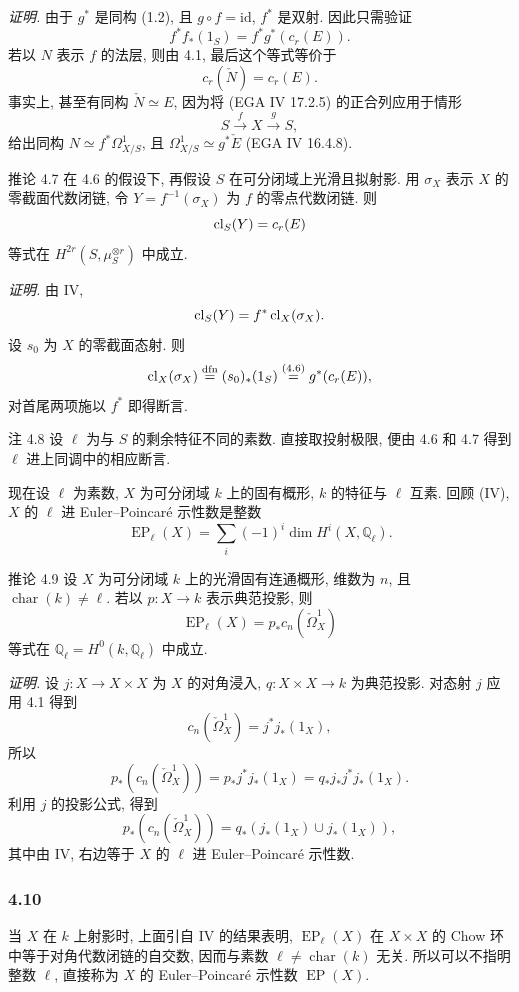 \emph{证明.} 由于 $g^*$ 是同构 (1.2), 且 $g\circ f=\mathrm{id}$, $f^*$ 是双射. 因此只需验证
\[
f^*f_*(1_S)=f^*g^*(c_r(E)).
\]
若以 $N$ 表示 $f$ 的法层, 则由 4.1, 最后这个等式等价于
\[
c_r(\check N)=c_r(E).
\]
事实上, 甚至有同构 $\check N\simeq E$, 因为将 (EGA IV 17.2.5) 的正合列应用于情形
\[
S\xrightarrow{f} X\xrightarrow{g} S,
\]
给出同构 $N\simeq f^*\Omega^1_{X/S}$, 且 $\Omega^1_{X/S}\simeq g^*\check E$ (EGA IV 16.4.8).

\begin{statement}{推论 4.7}
在 4.6 的假设下, 再假设 $S$ 在可分闭域上光滑且拟射影. 用 $\sigma_X$ 表示 $X$ 的零截面代数闭链, 令 $Y=f^{-1}(\sigma_X)$ 为 $f$ 的零点代数闭链. 则
\[
\operatorname{cl}_S(Y)=c_r(E)
\]
等式在 $H^{2r}(S,\mu_S^{\otimes r})$ 中成立.
\end{statement}

\emph{证明.} 由 IV,
\[
\operatorname{cl}_S(Y)=f^*\operatorname{cl}_X(\sigma_X).
\]
设 $s_0$ 为 $X$ 的零截面态射. 则
\[
\operatorname{cl}_X(\sigma_X)\stackrel{\mathrm{dfn}}{=}(s_0)_*(1_S)\stackrel{(4.6)}{=}g^*(c_r(E)),
\]
对首尾两项施以 $f^*$ 即得断言.

\begin{statement}{注 4.8}
设 $\ell$ 为与 $S$ 的剩余特征不同的素数. 直接取投射极限, 便由 4.6 和 4.7 得到 $\ell$ 进上同调中的相应断言.
\end{statement}

现在设 $\ell$ 为素数, $X$ 为可分闭域 $k$ 上的固有概形, $k$ 的特征与 $\ell$ 互素. 回顾 (IV), $X$ 的 $\ell$ 进 Euler--Poincaré 示性数是整数
\[
\operatorname{EP}_\ell(X)=\sum_i(-1)^i\dim H^i(X,\mathbb Q_\ell).
\]

\begin{statement}{推论 4.9}
设 $X$ 为可分闭域 $k$ 上的光滑固有连通概形, 维数为 $n$, 且 $\operatorname{char}(k)\ne\ell$. 若以 $p:X\to k$ 表示典范投影, 则
\[
\operatorname{EP}_\ell(X)=p_*c_n(\check\Omega^1_X)
\]
等式在 $\mathbb Q_\ell=H^0(k,\mathbb Q_\ell)$ 中成立.
\end{statement}

\emph{证明.} 设 $j:X\to X\times X$ 为 $X$ 的对角浸入, $q:X\times X\to k$ 为典范投影. 对态射 $j$ 应用 4.1 得到
\[
c_n(\check\Omega^1_X)=j^*j_*(1_X),
\]
所以
\[
p_*(c_n(\check\Omega^1_X))=p_*j^*j_*(1_X)=q_*j_*j^*j_*(1_X).
\]
利用 $j$ 的投影公式, 得到
\[
p_*(c_n(\check\Omega^1_X))=q_*(j_*(1_X)\cup j_*(1_X)),
\]
其中由 IV, 右边等于 $X$ 的 $\ell$ 进 Euler--Poincaré 示性数.

\subsubsection*{4.10}
当 $X$ 在 $k$ 上射影时, 上面引自 IV 的结果表明, $\operatorname{EP}_\ell(X)$ 在 $X\times X$ 的 Chow 环中等于对角代数闭链的自交数, 因而与素数 $\ell\ne\operatorname{char}(k)$ 无关. 所以可以不指明整数 $\ell$, 直接称为 $X$ 的 Euler--Poincaré 示性数 $\operatorname{EP}(X)$.

